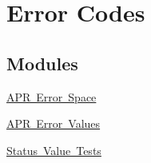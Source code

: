 \hypertarget{group__apr__errno}{}\section{Error Codes}
\label{group__apr__errno}
\subsection*{Modules}
\begin{DoxyCompactItemize}
\item 
\mbox{\hyperlink{group___a_p_r___e_r_r_o_r__map}{A\+P\+R Error Space}}
\item 
\mbox{\hyperlink{group___a_p_r___error}{A\+P\+R Error Values}}
\item 
\mbox{\hyperlink{group___a_p_r___s_t_a_t_u_s___i_s}{Status Value Tests}}
\end{DoxyCompactItemize}
